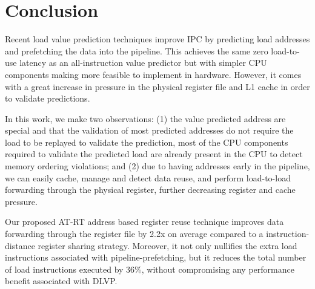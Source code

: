 \documentclass{sig-alternate}
\begin{document}
\section{Conclusion}
Recent load value prediction techniques improve IPC by predicting load addresses and prefetching the data into the pipeline. This achieves the same zero load-to-use latency as an all-instruction value predictor but with simpler CPU components making more feasible to implement in hardware. However, it comes with a great increase in pressure in the physical register file and L1 cache in order to validate predictions.

In this work, we make two observations: (1) the value predicted address are special and that the validation of most predicted addresses do not require the load to be replayed to validate the prediction, most of the CPU components required to validate the predicted load are already present in the CPU to detect memory ordering violations; and (2) due to having addresses early in the pipeline, we can easily cache, manage and detect data reuse, and perform load-to-load forwarding through the physical register, further decreasing register and cache pressure.

Our proposed AT-RT address based register reuse technique improves data forwarding through the register file by 2.2x on average compared to a instruction-distance register sharing strategy. Moreover, it not only nullifies the extra load instructions associated with pipeline-prefetching, but it reduces the total number of load instructions executed by 36\%, without compromising any performance benefit associated with DLVP.













\end{document}
